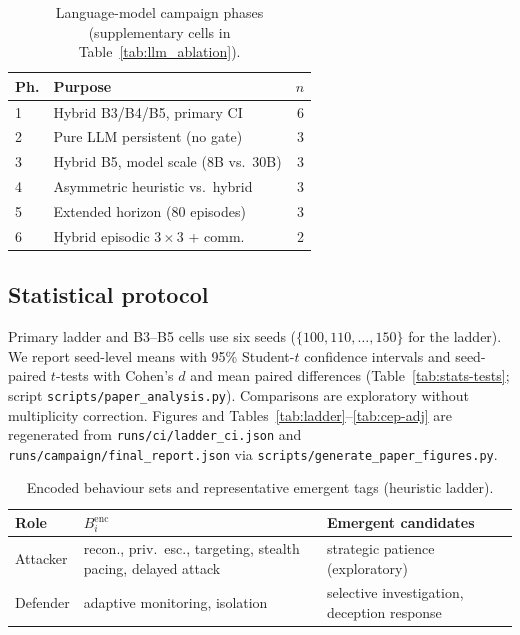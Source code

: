 \begin{table}[!t]
\caption{Language-model campaign phases (supplementary cells in Table~\ref{tab:llm_ablation}).}
\label{tab:llm-phases}
\centering
\setlength{\tabcolsep}{2pt}
\footnotesize
\begin{tabularx}{\columnwidth}{@{}lXr@{}}
\toprule
\textbf{Ph.} & \textbf{Purpose} & \textbf{$n$} \\
\midrule
1 & Hybrid B3/B4/B5, primary CI & 6 \\
2 & Pure LLM persistent (no gate) & 3 \\
3 & Hybrid B5, model scale (8B vs.\ 30B) & 3 \\
4 & Asymmetric heuristic vs.\ hybrid & 3 \\
5 & Extended horizon (80 episodes) & 3 \\
6 & Hybrid episodic $3{\times}3$ + comm. & 2 \\
\bottomrule
\end{tabularx}
\end{table}

\subsection{Statistical protocol}
\label{sec:method-stats}

Primary ladder and B3--B5 cells use six seeds
($\{100,110,\ldots,150\}$ for the ladder). We report seed-level means with
95\% Student-$t$ confidence intervals and seed-paired $t$-tests with Cohen's
$d$ and mean paired differences (Table~\ref{tab:stats-tests}; script
\texttt{scripts/paper\_analysis.py}). Comparisons are exploratory without
multiplicity correction. Figures and Tables~\ref{tab:ladder}--\ref{tab:cep-adj}
are regenerated from \texttt{runs/ci/ladder\_ci.json} and
\texttt{runs/campaign/final\_report.json} via
\texttt{scripts/generate\_paper\_figures.py}.

\begin{table}[!t]
\caption{Encoded behaviour sets and representative emergent tags (heuristic ladder).}
\label{tab:encoded}
\centering
\setlength{\tabcolsep}{3pt}
\small
\begin{tabularx}{\columnwidth}{@{}lXX@{}}
\toprule
\textbf{Role} & \textbf{$B_i^{\mathrm{enc}}$} & \textbf{Emergent candidates} \\
\midrule
Attacker & recon., priv.\ esc., targeting, stealth pacing, delayed attack
  & strategic patience (exploratory) \\
Defender & adaptive monitoring, isolation
  & selective investigation, deception response \\
\bottomrule
\end{tabularx}
\end{table}

